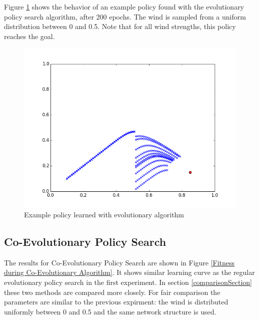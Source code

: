 Figure \ref{Example policy learned with evolutionary algorithm} shows the behavior of an example policy found with the evolutionary policy search algorithm, after 200 epochs. The wind is sampled from a uniform distribution between 0 and 0.5. Note that for all wind strengths, this policy reaches the goal. 

\begin{figure}[ht]
  \centering
  \includegraphics[scale=0.5]{images/evo_result.png}
  \caption{Example policy learned with evolutionary algorithm}\label{Example policy learned with evolutionary algorithm}
\end{figure}

\subsection{Co-Evolutionary Policy Search}

The results for Co-Evolutionary Policy Search are shown in Figure \ref{Fitness during Co-Evolutionary Algorithm}. It shows similar learning curve as the regular evolutionary policy search in the first experiment. In section \ref{comparisonSection} these two methods are compared more closely. For fair comparison the parameters are similar to the previous expirment: the wind is distributed uniformly between 0 and 0.5 and the same network structure is used.

